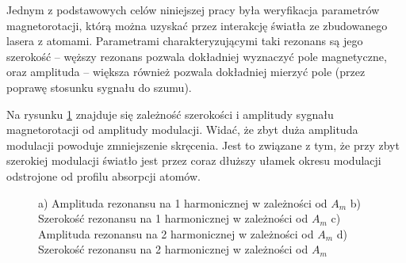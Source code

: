 \documentclass[a4paper,10pt,twoside]{article}
\begin{document}
Jednym z podstawowych celów niniejszej pracy była weryfikacja parametrów magnetorotacji, którą można uzyskać przez interakcję światła ze zbudowanego lasera z atomami.
Parametrami charakteryzującymi taki rezonans są jego  szerokość -- węższy rezonans pozwala dokładniej wyznaczyć pole magnetyczne, oraz amplituda -- większa również pozwala dokładniej mierzyć pole (przez poprawę stosunku sygnału do szumu).

Na rysunku \ref{wykresikioda} znajduje się zależność szerokości i amplitudy sygnału magnetorotacji od amplitudy modulacji. Widać, że zbyt duża amplituda modulacji powoduje zmniejszenie skręcenia. Jest to związane z tym, że przy zbyt szerokiej modulacji światło jest przez coraz dłuższy ułamek okresu modulacji odstrojone od profilu absorpcji atomów. 

\begin{figure}[h!]
\centering
{}


\caption{ a) Amplituda rezonansu na 1 harmonicznej w zależności od $A_m$ b) Szerokość rezonansu na 1 harmonicznej w zależności od $A_m$ 
c) Amplituda rezonansu na 2 harmonicznej w zależności od $A_m$ d) Szerokość rezonansu na 2 harmonicznej w zależności od $A_m$}
\label{wykresikioda}
\end{figure}
\end{document}
